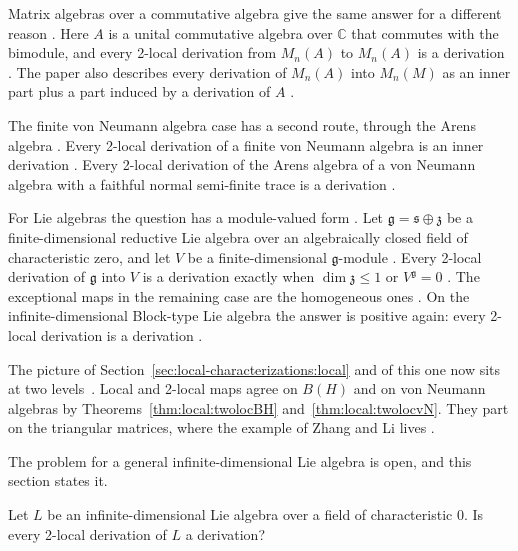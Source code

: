 Matrix algebras over a commutative algebra give the same answer for a
different reason \cite[p.~9]{HuangLiQian2018Matrix}. Here $A$ is a unital
commutative algebra over $\mathbb{C}$ that commutes with the bimodule, and
every 2-local derivation from $M_n(A)$ to $M_n(A)$ is a derivation
\cite[Theorem~3.6, p.~10]{HuangLiQian2018Matrix}. The paper also describes
every derivation of $M_n(A)$ into $M_n(M)$ as an inner part plus a part
induced by a derivation of $A$ \cite[Theorem~2.1,
p.~4]{HuangLiQian2018Matrix}.

The finite von Neumann algebra case has a second route, through the Arens
algebra \cite[Theorem~3.4, p.~11]{AyupovKudaybergenovNurjanovAlauatdinov2011}.
Every 2-local derivation of a finite von Neumann algebra is an inner
derivation \cite[Theorem~3.4,
p.~11]{AyupovKudaybergenovNurjanovAlauatdinov2011}. Every 2-local derivation
of the Arens algebra of a von Neumann algebra with a faithful normal
semi-finite trace is a derivation \cite[Theorem~3.2,
p.~9]{AyupovKudaybergenovNurjanovAlauatdinov2011}.

For Lie algebras the question has a module-valued form
\cite[p.~1]{ChenLuoXu2026}. Let $\mathfrak{g}=\mathfrak{s}\oplus \mathfrak{z}$
be a finite-dimensional reductive Lie algebra over an algebraically closed
field of characteristic zero, and let $V$ be a finite-dimensional
$\mathfrak{g}$-module \cite[p.~1]{ChenLuoXu2026}. Every 2-local derivation of
$\mathfrak{g}$ into $V$ is a derivation exactly when $\dim\mathfrak{z}\leq1$
or $V^{\mathfrak{g}}=0$ \cite[Corollary~1.3, p.~2]{ChenLuoXu2026}. The
exceptional maps in the remaining case are the homogeneous ones
\cite[Theorem~1.2, p.~2]{ChenLuoXu2026}. On the infinite-dimensional
Block-type Lie algebra the answer is positive again: every 2-local derivation
is a derivation \cite[Theorem~3.6, p.~9]{ChenGuo2026}.

The picture of
Section~\ref{sec:local-characterizations:local} and of this one now
sits at two levels~\cite[p.~15]{AyupovKudaybergenov2012}.
Local and 2-local maps agree on $B(H)$ and on von
Neumann algebras by Theorems~\ref{thm:local:twolocBH}
and~\ref{thm:local:twolocvN}. They part on the triangular matrices, where
the example of Zhang and Li lives \cite[p.~15]{AyupovKudaybergenov2012}.

The problem for a general infinite-dimensional Lie algebra is open, and this
section states it.

\begin{problem}\label{prob:open:twolocal}
Let $L$ be an infinite-dimensional Lie algebra over a field of characteristic
$0$.
Is every 2-local derivation of $L$ a derivation?
\end{problem}


